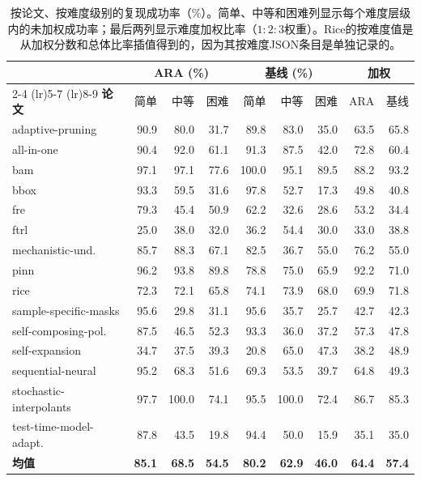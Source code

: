 \documentclass[
]{article}
\theoremstyle{definition}
\begin{document}
\begin{table}[h]
\centering
\small
\begin{tabular}{l rrr rrr rr}
\toprule
& \multicolumn{3}{c}{\textbf{ARA (\%)}} & \multicolumn{3}{c}{\textbf{基线 (\%)}} & \multicolumn{2}{c}{\textbf{加权}} \\
\cmidrule(lr){2-4} \cmidrule(lr){5-7} \cmidrule(lr){8-9}
\textbf{论文} & 简单 & 中等 & 困难 & 简单 & 中等 & 困难 & ARA & 基线 \\
\midrule
adaptive-pruning        & 90.9 & 80.0 & 31.7 & 89.8 & 83.0 & 35.0 & 63.5 & 65.8 \\
all-in-one              & 90.4 & 92.0 & 61.1 & 91.3 & 87.5 & 42.0 & 72.8 & 60.4 \\
bam                     & 97.1 & 97.1 & 77.6 & 100.0 & 95.1 & 89.5 & 88.2 & 93.2 \\
bbox                    & 93.3 & 59.5 & 31.6 & 97.8 & 52.7 & 17.3 & 49.8 & 40.8 \\
fre                     & 79.3 & 45.4 & 50.9 & 62.2 & 32.6 & 28.6 & 53.2 & 34.4 \\
ftrl                    & 25.0 & 38.0 & 32.0 & 36.2 & 54.4 & 30.0 & 33.0 & 38.8 \\
mechanistic-und.        & 85.7 & 88.3 & 67.1 & 82.5 & 36.7 & 55.0 & 76.2 & 55.0 \\
pinn                    & 96.2 & 93.8 & 89.8 & 78.8 & 75.0 & 65.9 & 92.2 & 71.0 \\
rice                    & 72.3 & 72.1 & 65.8 & 74.1 & 73.9 & 68.0 & 69.9 & 71.8 \\
sample-specific-masks   & 95.6 & 29.8 & 31.1 & 95.6 & 35.7 & 25.7 & 42.7 & 42.3 \\
self-composing-pol.     & 87.5 & 46.5 & 52.3 & 93.3 & 36.0 & 37.2 & 57.3 & 47.8 \\
self-expansion          & 34.7 & 37.5 & 39.3 & 20.8 & 65.0 & 47.3 & 38.2 & 48.9 \\
sequential-neural       & 95.2 & 68.3 & 51.6 & 69.3 & 53.5 & 39.7 & 64.8 & 49.3 \\
stochastic-interpolants & 97.7 & 100.0 & 74.1 & 95.5 & 100.0 & 72.4 & 86.7 & 85.3 \\
test-time-model-adapt.  & 87.8 & 43.5 & 19.8 & 94.4 & 50.0 & 15.9 & 35.1 & 35.0 \\
\midrule
\textbf{均值}           & \textbf{85.1} & \textbf{68.5} & \textbf{54.5} & \textbf{80.2} & \textbf{62.9} & \textbf{46.0} & \textbf{64.4} & \textbf{57.4} \\
\bottomrule
\end{tabular}
\caption{按论文、按难度级别的复现成功率（\%）。简单、中等和困难列显示每个难度层级内的未加权成功率；最后两列显示难度加权比率（$1\!:\!2\!:\!3$权重）。Rice的按难度值是从加权分数和总体比率插值得到的，因为其按难度JSON条目是单独记录的。}
\label{tab-repro-per-difficulty}
\end{table}
\end{document}
